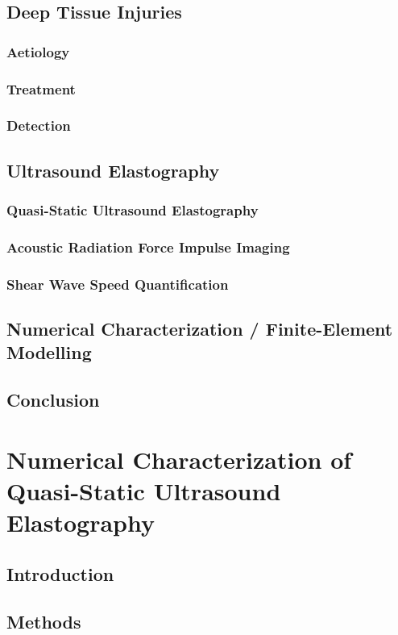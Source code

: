 \documentclass[12pt]{book}
\begin{document}
	\section{Deep Tissue Injuries}
		\subsection{Aetiology}
		\subsection{Treatment}
		\subsection{Detection}
	\section{Ultrasound Elastography}
		\subsection{Quasi-Static Ultrasound Elastography}
		\subsection{Acoustic Radiation Force Impulse Imaging}
		\subsection{Shear Wave Speed Quantification}
	\section{Numerical Characterization / Finite-Element Modelling}
	\section{Conclusion}

\chapter{Numerical Characterization of Quasi-Static Ultrasound Elastography}
	\section{Introduction}
	\section{Methods}
\end{document}
